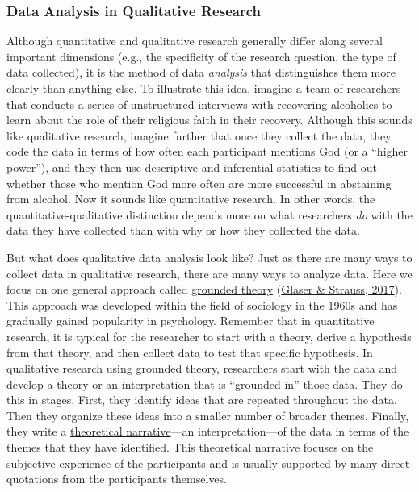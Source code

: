 \documentclass[
]{krantz}
\begin{document}
\hypertarget{data-analysis-in-qualitative-research}{%
\subsubsection*{Data Analysis in Qualitative Research}\label{data-analysis-in-qualitative-research}}


Although quantitative and qualitative research generally differ along several important dimensions (e.g., the specificity of the research question, the type of data collected), it is the method of data \emph{analysis} that distinguishes them more clearly than anything else. To illustrate this idea, imagine a team of researchers that conducts a series of unstructured interviews with recovering alcoholics to learn about the role of their religious faith in their recovery. Although this sounds like qualitative research, imagine further that once they collect the data, they code the data in terms of how often each participant mentions God (or a ``higher power''), and they then use descriptive and inferential statistics to find out whether those who mention God more often are more successful in abstaining from alcohol. Now it sounds like quantitative research. In other words, the quantitative-qualitative distinction depends more on what researchers \emph{do} with the data they have collected than with why or how they collected the data.

But what does qualitative data analysis look like? Just as there are many ways to collect data in qualitative research, there are many ways to analyze data. Here we focus on one general approach called \protect\hyperlink{grounded-theory}{grounded theory} (\protect\hyperlink{ref-glaser2017discovery}{Glaser \& Strauss, 2017}). This approach was developed within the field of sociology in the 1960s and has gradually gained popularity in psychology. Remember that in quantitative research, it is typical for the researcher to start with a theory, derive a hypothesis from that theory, and then collect data to test that specific hypothesis. In qualitative research using grounded theory, researchers start with the data and develop a theory or an interpretation that is ``grounded in'' those data. They do this in stages. First, they identify ideas that are repeated throughout the data. Then they organize these ideas into a smaller number of broader themes. Finally, they write a \protect\hyperlink{theoretical-narrative}{theoretical narrative}---an interpretation---of the data in terms of the themes that they have identified. This theoretical narrative focuses on the subjective experience of the participants and is usually supported by many direct quotations from the participants themselves.
\end{document}
